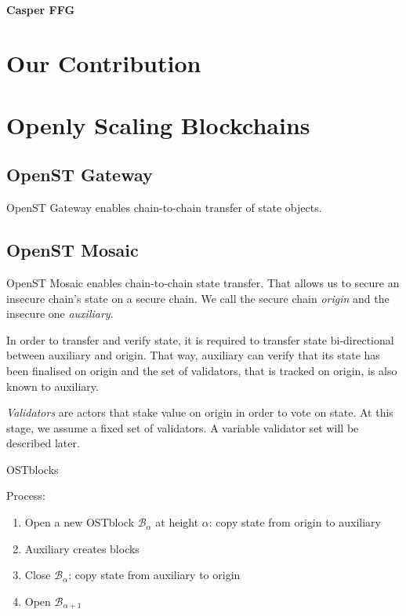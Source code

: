 \documentclass[12pt,a4paper,draft]{article}
\newcommand{\B}{\mathcal{B}}
\begin{document}
\paragraph{Casper FFG}
\cite{casperffg}

%
%
\section{Our Contribution}

%
%
\section{Openly Scaling Blockchains}

\subsection{OpenST Gateway}
\label{subsec:gateway}

OpenST Gateway enables chain-to-chain transfer of state objects.

\subsection{OpenST Mosaic}
\label{subsec:mosaic}

OpenST Mosaic enables chain-to-chain state transfer.
That allows us to secure an insecure chain's state on a secure chain.
We call the secure chain \emph{origin} and the insecure one \emph{auxiliary}.

In order to transfer and verify state, it is required to transfer state bi-directional between auxiliary and origin.
That way, auxiliary can verify that its state has been finalised on origin and
the set of validators, that is tracked on origin, is also known to auxiliary.

\emph{Validators} are actors that stake value on origin in order to vote on state.
At this stage, we assume a fixed set of validators.
A variable validator set will be described later.

OSTblocks

Process:
\begin{enumerate}
	\item Open a new OSTblock $\B_\alpha$ at height $\alpha$: copy state from origin to auxiliary
	\item Auxiliary creates blocks
	\item Close $\B_\alpha$: copy state from auxiliary to origin
	\item Open $\B_{\alpha+1}$
\end{enumerate}
\end{document}
